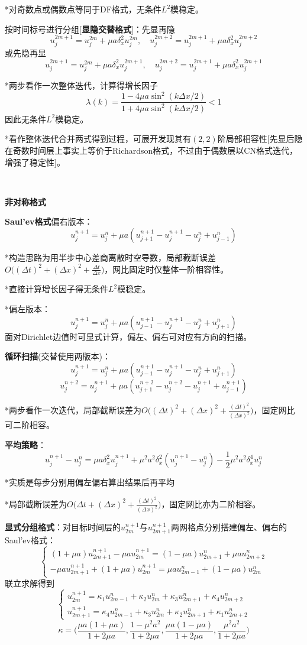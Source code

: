 \documentclass[a4paper,UTF8,fontset=windows]{ctexart}
\begin{document}
*对奇数点或偶数点等同于DF格式，无条件$L^2$模稳定。

按时间标号进行分组[\textbf{显隐交替格式}]：先显再隐
$$u_j^{2m+1}=u_j^{2m}+\mu a\delta_x^2u_j^{2m},\quad u_j^{2m+2}=u_j^{2m+1}+\mu a\delta_x^2u_j^{2m+2}$$
或先隐再显
$$u_j^{2m+1}=u_j^{2m}+\mu a\delta_x^2u_j^{2m+1},\quad u_j^{2m+2}=u_j^{2m+1}+\mu a\delta_x^2u_j^{2m+1}$$

*两步看作一次整体迭代，计算得增长因子
$$\lambda(k)=\frac{1-4\mu a\sin^2(k\Delta x/2)}{1+4\mu a\sin^2(k\Delta x/2)}<1$$
因此无条件$L^2$模稳定。

*看作整体迭代合并两式得到过程，可展开发现其有$(2,2)$阶局部相容性[先显后隐在奇数时间层上事实上等价于Richardson格式，不过由于偶数层以CN格式迭代，增强了稳定性]。

\

\textbf{非对称格式}

\textbf{Saul'ev格式}偏右版本：
$$u_j^{n+1}=u_j^n+\mu a(u_{j+1}^{n+1}-u_j^{n+1}-u_j^n+u_{j-1}^n)$$

*构造思路为用半步中心差商离散时空导数，局部截断误差$O\big((\Delta t)^2+(\Delta x)^2+\frac{\Delta t}{\Delta x}\big)$，网比固定时仅整体一阶相容性。

*直接计算增长因子得无条件$L^2$模稳定。

*偏左版本：
$$u_j^{n+1}=u_j^n+\mu a(u_{j-1}^{n+1}-u_j^{n+1}-u_j^n+u_{j+1}^n)$$
面对Dirichlet边值时可显式计算，偏左、偏右可对应有方向的扫描。

\textbf{循环扫描}(交替使用两版本)：
$$u_j^{n+1}=u_j^n+\mu a(u_{j-1}^{n+1}-u_j^{n+1}-u_j^n+u_{j+1}^n)$$
$$u_j^{n+2}=u_j^{n+1}+\mu a(u_{j+1}^{n+2}-u_j^{n+2}-u_j^{n+1}+u_{j-1}^{n+1})$$

*两步看作一次迭代，局部截断误差为$O\big((\Delta t)^2+(\Delta x)^2+\frac{(\Delta t)^2}{(\Delta x)^2}\big)$，固定网比可二阶相容。

\textbf{平均策略}：
$$u_j^{n+1}-u_j^n=\mu a\delta_x^2u_j^{n+1}+\mu^2a^2\delta_x^2(u_j^{n+1}-u_j^n)-\frac{1}{2}\mu^2a^2\delta_x^4u_j^n$$

*实质是每步分别用偏左偏右算出结果后再平均

*局部截断误差为$O\big(\Delta t+(\Delta x)^2+\frac{(\Delta t)^2}{(\Delta x)^2}\big)$，固定网比亦为二阶相容。

\textbf{显式分组格式}：对目标时间层的$u_{2m}^{n+1}$与$u_{2m+1}^{n+1}$两网格点分别搭建偏左、偏右的Saul'ev格式：
$$\begin{cases}(1+\mu a)u_{2m+1}^{n+1}-\mu au_{2m}^{n+1}=(1-\mu a)u_{2m+1}^n+\mu au_{2m+2}^n\\-\mu au_{2m+1}^{n+1}+(1+\mu a)u_{2m}^{n+1}=\mu au_{2m-1}^n+(1-\mu a)u_{2m}^n\end{cases}$$
联立求解得到
$$\begin{cases}u_{2m}^{n+1}=\kappa_1u_{2m-1}^n+\kappa_2u_{2m}^n+\kappa_3u_{2m+1}^n+\kappa_4u_{2m+2}^n\\u_{2m+1}^{n+1}=\kappa_4u_{2m-1}^n+\kappa_3u_{2m}^n+\kappa_2u_{2m+1}^n+\kappa_1u_{2m+2}^n\end{cases}$$
$$\kappa=\bigg(\frac{\mu a(1+\mu a)}{1+2\mu a},\frac{1-\mu^2a^2}{1+2\mu a},\frac{\mu a(1-\mu a)}{1+2\mu a},\frac{\mu^2a^2}{1+2\mu a}\bigg)$$
\end{document}
